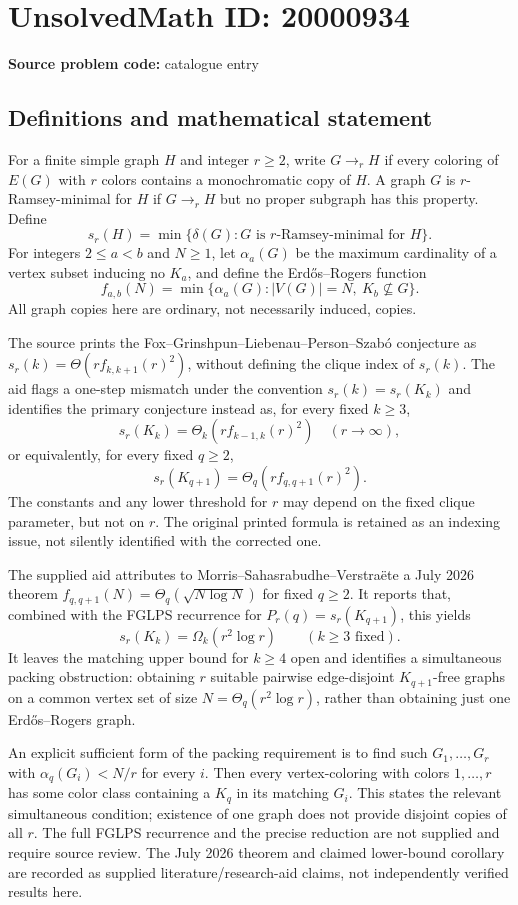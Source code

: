 \documentclass[11pt]{article}
\begin{document}
\section*{UnsolvedMath ID: 20000934}
\textbf{Source problem code:} catalogue entry
\subsection{Definitions and mathematical statement}
For a finite simple graph $H$ and integer $r\geq2$, write $G\to_r H$ if every coloring of $E(G)$ with $r$ colors contains a monochromatic copy of $H$. A graph $G$ is $r$-Ramsey-minimal for $H$ if $G\to_r H$ but no proper subgraph has this property. Define
\[
 s_r(H)=\min\{\delta(G):G\text{ is $r$-Ramsey-minimal for }H\}.
\]
For integers $2\leq a<b$ and $N\geq1$, let $\alpha_a(G)$ be the maximum cardinality of a vertex subset inducing no $K_a$, and define the Erd\H{o}s--Rogers function
\[
 f_{a,b}(N)=\min\{\alpha_a(G): |V(G)|=N,\ K_b\not\subseteq G\}.
\]
All graph copies here are ordinary, not necessarily induced, copies.

The source prints the Fox--Grinshpun--Liebenau--Person--Szab\'o conjecture as $s_r(k)=\Theta(r f_{k,k+1}(r)^2)$, without defining the clique index of $s_r(k)$. The aid flags a one-step mismatch under the convention $s_r(k)=s_r(K_k)$ and identifies the primary conjecture instead as, for every fixed $k\geq3$,
\[
 s_r(K_k)=\Theta_k\!\left(r f_{k-1,k}(r)^2\right)\quad(r\to\infty),
\]
or equivalently, for every fixed $q\geq2$,
\[
 s_r(K_{q+1})=\Theta_q\!\left(r f_{q,q+1}(r)^2\right).
\]
The constants and any lower threshold for $r$ may depend on the fixed clique parameter, but not on $r$. The original printed formula is retained as an indexing issue, not silently identified with the corrected one.

The supplied aid attributes to Morris--Sahasrabudhe--Verstra\"ete a July 2026 theorem $f_{q,q+1}(N)=\Theta_q(\sqrt{N\log N})$ for fixed $q\geq2$. It reports that, combined with the FGLPS recurrence for $P_r(q)=s_r(K_{q+1})$, this yields
\[
 s_r(K_k)=\Omega_k(r^2\log r)\qquad(k\geq3\text{ fixed}).
\]
It leaves the matching upper bound for $k\geq4$ open and identifies a simultaneous packing obstruction: obtaining $r$ suitable pairwise edge-disjoint $K_{q+1}$-free graphs on a common vertex set of size $N=\Theta_q(r^2\log r)$, rather than obtaining just one Erd\H{o}s--Rogers graph.

An explicit sufficient form of the packing requirement is to find such $G_1,\ldots,G_r$ with $\alpha_q(G_i)<N/r$ for every $i$. Then every vertex-coloring with colors $1,\ldots,r$ has some color class containing a $K_q$ in its matching $G_i$. This states the relevant simultaneous condition; existence of one graph does not provide disjoint copies of all $r$. The full FGLPS recurrence and the precise reduction are not supplied and require source review. The July 2026 theorem and claimed lower-bound corollary are recorded as supplied literature/research-aid claims, not independently verified results here.
\end{document}
